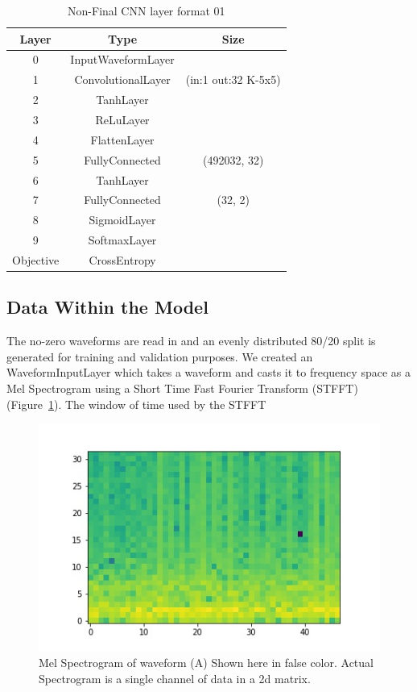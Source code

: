 \documentclass[conference]{IEEEtran}
\begin{document}
\begin{table}[htbp]
\caption{Non-Final CNN layer format 01}
\begin{center}
\begin{tabular}{|c|c|c|}
\hline
\textbf{Layer}&\textbf{Type}&\textbf{Size} \\
\cline{2-3} 
\hline
 0 & InputWaveformLayer & \\
 1 & ConvolutionalLayer & (in:1 out:32 K-5x5) \\
 2 & TanhLayer & \\
 3 & ReLuLayer & \\
 4 & FlattenLayer & \\
 5 & FullyConnected & (492032, 32) \\
 6 & TanhLayer & \\
 7 & FullyConnected & (32, 2) \\
 8 & SigmoidLayer & \\
 9 & SoftmaxLayer & \\
 Objective & CrossEntropy & \\
\hline
\end{tabular}
\label{tab1}
\end{center}
\end{table}

\subsection{Data Within the Model}

The no-zero waveforms are read in and an evenly distributed 80/20 split is generated
for training and validation purposes. We created an WaveformInputLayer which
takes a waveform and casts it to frequency space as a Mel Spectrogram using a
Short Time Fast Fourier Transform (STFFT) (Figure~\ref{melspec}). The window of time used by the STFFT
\begin{figure}[htbp]
\centerline{\includegraphics[width=.5\textwidth]{images/data/spectrogram_153.jpg}}
\caption{Mel Spectrogram of waveform (A) Shown here in false color. Actual Spectrogram is a single channel of data in a 2d matrix.}
\label{melspec}
\end{figure}
\end{document}
